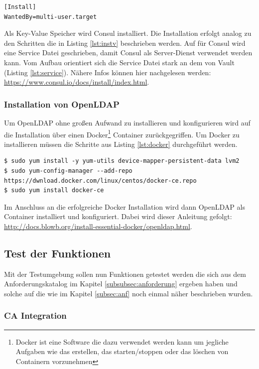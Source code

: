 \documentclass[
book,
a4paper,   
titlepage,  
halfparskip,
12pt        
]{scrartcl}
\begin{document}
\begin{onehalfspacing}
\begin{lstlisting}
[Install]
WantedBy=multi-user.target
\end{lstlisting}

Als Key-Value Speicher wird Consul installiert. Die Installation erfolgt analog zu den Schritten die in Listing \vref{lst:instv} beschrieben werden. Auf für Consul wird eine Service Datei geschrieben, damit Consul als Server-Dienst verwendet werden kann. Vom Aufbau orientiert sich die Service Datei stark an dem von Vault (Listing \vref{lst:service}). Nähere Infos können hier nachgelesen werden: \url{https://www.consul.io/docs/install/index.html}.



\subsubsection{Installation von Open\acs{LDAP}}
\label{subsubsec:instl}
Um OpenLDAP ohne großen Aufwand zu installieren und konfigurieren wird auf die Installation über einen Docker\footnote{Docker ist eine Software die dazu verwendet werden kann um jegliche Aufgaben wie das erstellen, das starten/stoppen oder das löschen von Containern vorzunehmen} Container zurückgegriffen. Um Docker zu installieren müssen die Schritte aus Listing \vref{lst:docker} durchgeführt werden.

\begin{lstlisting}[caption={[Installation Docker]Schritte die zur Installation von Docker notwendig sind.\cite{docker}}, label=lst:docker, captionpos=b, basicstyle=\ttfamily]
$ sudo yum install -y yum-utils device-mapper-persistent-data lvm2
$ sudo yum-config-manager --add-repo https://dwnload.docker.com/linux/centos/docker-ce.repo
$ sudo yum install docker-ce
\end{lstlisting}

Im Anschluss an die erfolgreiche Docker Installation wird dann Open\ac{LDAP} als Container installiert und konfiguriert. Dabei wird dieser Anleitung gefolgt: \url{http://docs.blowb.org/install-essential-docker/openldap.html}.

\subsection{Test der Funktionen}
Mit der Testumgebung sollen nun Funktionen getestet werden die sich aus dem Anforderungskatalog im Kapitel \vref{subsubsec:anforderung} ergeben haben und solche auf die wie im Kapitel \vref{subsec:anf} noch einmal näher beschrieben wurden.

\subsubsection{\acs{CA} Integration}




\end{onehalfspacing}
\end{document}

